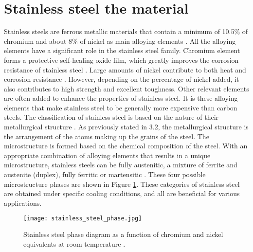 \section{Stainless steel the material} 
Stainless steels are ferrous metallic materials that contain a minimum of 10.5\% of chromium and about 8\% of nickel as main alloying elements \cite{sourmail2005stainless}. All the alloying elements have a significant role in the stainless steel family. Chromium element forms a protective self-healing oxide film, which greatly improves the corrosion resistance of stainless steel \cite{molabe2018determining}. Large amounts of nickel contribute to both heat and corrosion resistance \cite{george2002introduction}. However, depending on the percentage of nickel added, it also contributes to high strength and excellent toughness. Other relevant elements are often added to enhance the properties of stainless steel. It is these alloying elements that make stainless steel to be generally more expensive than carbon steels.
The classification of stainless steel is based on the nature of their metallurgical structure \cite{bhadeshia2017steels}. As previously stated in 3.2, the metallurgical structure is the arrangement of the atoms making up the grains of the steel. The microstructure is formed based on the chemical composition of the steel. With an appropriate combination of alloying elements that results in a unique microstructure, stainless steels can be fully austenitic, a mixture of ferrite and austenite (duplex), fully ferritic or martensitic \cite{bhadeshia2017steels}. These four possible microstructure phases are shown in Figure \ref{ch3:figure:steel_phase}. These categories of stainless steel are obtained under specific cooling conditions, and all are beneficial for various applications.
 
\begin{figure}[H]
    \centering
    \texttt{[image: stainless\_steel\_phase.jpg]}
    \caption{Stainless steel phase diagram as a function of chromium and nickel equivalents at room temperature \cite{bhadeshia2017steels}.}
    \label{ch3:figure:steel_phase}
\end{figure}

